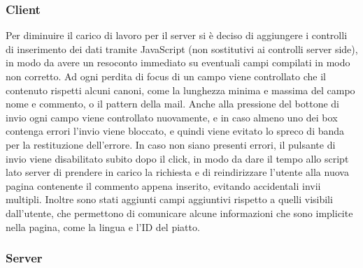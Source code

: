\documentclass[10pt,a4paper,onecolumn]{article}
\begin{document}
\subsubsection*{Client}

Per diminuire il carico di lavoro per il server si è deciso di aggiungere i controlli di inserimento dei dati tramite JavaScript (non sostitutivi ai controlli server side), in modo da avere un resoconto immediato su eventuali campi compilati in modo non corretto. Ad ogni perdita di focus di un campo viene controllato che il contenuto rispetti alcuni canoni, come la lunghezza minima e massima del campo nome e commento, o il pattern della mail.
Anche alla pressione del bottone di invio ogni campo viene controllato nuovamente, e in caso almeno uno dei box contenga errori l’invio viene bloccato, e quindi viene evitato lo spreco di banda per la restituzione dell’errore. In caso non siano presenti errori, il pulsante di invio viene disabilitato subito dopo il click, in modo da dare il tempo allo script lato server di prendere in carico la richiesta e di reindirizzare l’utente alla nuova pagina contenente il commento appena inserito, evitando accidentali invii multipli.
Inoltre sono stati aggiunti campi aggiuntivi rispetto a quelli visibili dall’utente, che permettono di comunicare alcune informazioni che sono implicite nella pagina, come la lingua e l’ID del piatto.

\subsubsection*{Server}
\end{document}
